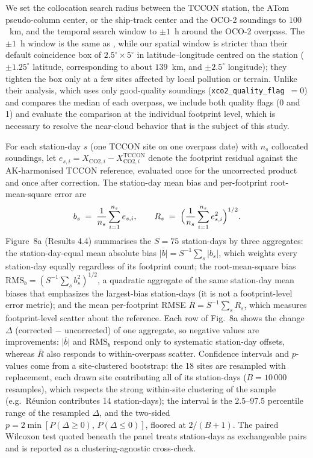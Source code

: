 We set the collocation search radius between the TCCON station, the ATom
pseudo-column center, or the ship-track center and the OCO-2 soundings to
$100$~km, and the temporal search window to $\pm1$~h around the OCO-2 overpass.
The $\pm1$~h window is the same as \citet{das2025oco2_v111_tccon_ggg2020}, while
our spatial window is stricter than their default coincidence box of
$2.5^\circ \times 5^\circ$ in latitude--longitude centred on the station
($\pm1.25^\circ$ latitude, corresponding to about $139$~km, and $\pm2.5^\circ$
longitude); they tighten the box only at a few sites affected by local pollution
or terrain. Unlike their analysis, which uses only good-quality soundings
(\texttt{xco2\_quality\_flag}~$=0$) and compares the median of each overpass, we
include both quality flags (0 and 1) and evaluate the comparison at the
individual footprint level, which is necessary to resolve the near-cloud
behavior that is the subject of this study.

For each station-day $s$ (one TCCON site on one overpass date) with $n_s$ collocated soundings, let
$e_{s,i} = X_{\mathrm{CO2},i} - X^{\mathrm{TCCON}}_{\mathrm{CO2},i}$ denote the footprint residual against the AK-harmonised TCCON reference, evaluated once for the uncorrected product and once after correction. The station-day mean bias and per-footprint root-mean-square error are
%
\begin{equation}
  b_s \;=\; \frac{1}{n_s}\sum_{i=1}^{n_s} e_{s,i},
  \qquad
  R_s \;=\; \Bigl(\frac{1}{n_s}\sum_{i=1}^{n_s} e_{s,i}^{2}\Bigr)^{1/2}.
\end{equation}
%
Figure~8a (Results 4.4) summarises the $S = 75$ station-days by three aggregates: the station-day-equal mean absolute bias $\overline{|b|} = S^{-1}\sum_s |b_s|$, which weights every station-day equally regardless of its footprint count; the root-mean-square bias $\mathrm{RMS}_b = (S^{-1}\sum_s b_s^{2})^{1/2}$, a quadratic aggregate of the same station-day mean biases that emphasizes the largest-bias station-days (it is not a footprint-level error metric); and the mean per-footprint RMSE $\overline{R} = S^{-1}\sum_s R_s$, which measures footprint-level scatter about the reference. Each row of Fig.~8a shows the change $\Delta$ (corrected $-$ uncorrected) of one aggregate, so negative values are improvements: $\overline{|b|}$ and $\mathrm{RMS}_b$ respond only to systematic station-day offsets, whereas $\overline{R}$ also responds to within-overpass scatter. Confidence intervals and
$p$-values come from a site-clustered bootstrap: the 18 sites are resampled with replacement, each drawn site contributing all of its station-days ($B = 10\,000$ resamples), which respects the strong
within-site clustering of the sample (e.g.\ R\'eunion contributes 14 station-days); the interval is the 2.5--97.5 percentile range of the resampled $\Delta$, and the two-sided $p = 2\min[P(\Delta \ge 0),\, P(\Delta \le 0)]$, floored at $2/(B+1)$. The paired Wilcoxon test quoted beneath the panel treats
station-days as exchangeable pairs and is reported as a clustering-agnostic cross-check.



